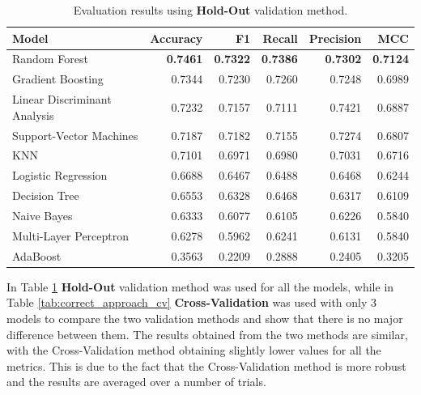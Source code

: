                 \newpage
                \begin{table}[htbp]
                    \centering
                    \caption{Evaluation results using \textbf{Hold-Out} validation method.}
                    \label{tab:correct_approach_holdout}
                    \begin{tabular}{lrrrrr}
                        \toprule
                        \textbf{Model} & \textbf{Accuracy} & \textbf{F1} & \textbf{Recall} & \textbf{Precision} & \textbf{MCC} \\
                        \midrule
                        Random Forest & \textbf{0.7461} & \textbf{0.7322} & \textbf{0.7386} & \textbf{0.7302} & \textbf{0.7124} \\
                        Gradient Boosting & 0.7344 & 0.7230 & 0.7260 & 0.7248 & 0.6989 \\
                        Linear Discriminant Analysis & 0.7232 & 0.7157 & 0.7111 & 0.7421 & 0.6887 \\
                        Support-Vector Machines & 0.7187 & 0.7182 & 0.7155 & 0.7274 & 0.6807 \\
                        KNN & 0.7101 & 0.6971 & 0.6980 & 0.7031 & 0.6716 \\
                        Logistic Regression & 0.6688 & 0.6467 & 0.6488 & 0.6468 & 0.6244 \\
                        Decision Tree & 0.6553 & 0.6328 & 0.6468 & 0.6317 & 0.6109 \\
                        Naive Bayes & 0.6333 & 0.6077 & 0.6105 & 0.6226 & 0.5840 \\
                        Multi-Layer Perceptron & 0.6278 & 0.5962 & 0.6241 & 0.6131 & 0.5840 \\
                        AdaBoost & 0.3563 & 0.2209 & 0.2888 & 0.2405 & 0.3205 \\
                        \bottomrule
                    \end{tabular}
                \end{table}

                In Table \ref{tab:correct_approach_holdout} \textbf{Hold-Out} validation method was used for all the models, while in Table \ref{tab:correct_approach_cv} \textbf{Cross-Validation} was used with only 3 models to compare the two validation methods and show that there is no major difference between them. The results obtained from the two methods are similar, with the Cross-Validation method obtaining slightly lower values for all the metrics. This is due to the fact that the Cross-Validation method is more robust and the results are averaged over a number of trials. \\


